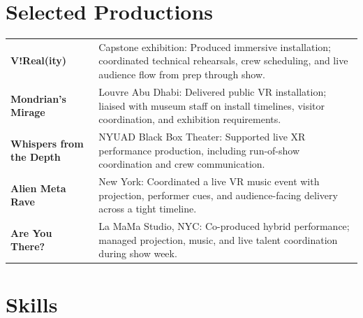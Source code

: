 \documentclass[letterpaper,10pt]{article}
\newlength{\prodlabelwidth}
\begin{document}
\section{Selected Productions}

{\setlength{\tabcolsep}{0pt}%
\begin{tabular}{@{}p{\prodlabelwidth}@{\hspace{6pt}}p{\textwidth-\prodlabelwidth-6pt}@{}}
  \textbf{V!Real(ity)}       & Capstone exhibition: Produced immersive installation; coordinated
    technical rehearsals, crew scheduling, and live audience flow from prep through show.\\[2pt]
  \textbf{Mondrian's Mirage} & Louvre Abu Dhabi: Delivered public VR installation; liaised with
    museum staff on install timelines, visitor coordination, and exhibition requirements.\\[2pt]
  \textbf{Whispers from the Depth} & NYUAD Black Box Theater: Supported live XR performance
    production, including run-of-show coordination and crew communication.\\[2pt]
  \textbf{Alien Meta Rave}   & New York: Coordinated a live VR music event with projection,
    performer cues, and audience-facing delivery across a tight timeline.\\[2pt]
  \textbf{Are You There?}    & La MaMa Studio, NYC: Co-produced hybrid performance; managed
    projection, music, and live talent coordination during show week.\\
\end{tabular}}

\section{Skills}
\end{document}
